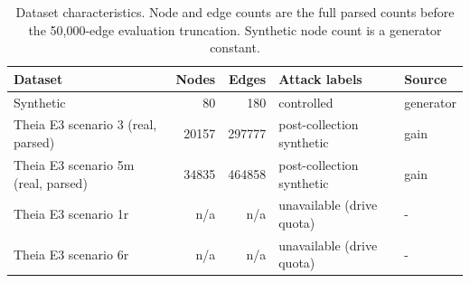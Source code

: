 \begin{table}[t]
\centering
\caption{Dataset characteristics. Node and edge counts are the full parsed counts before the 50{,}000-edge evaluation truncation. Synthetic node count is a generator constant.}
\label{tab:datasetsfull}
{\small
\begin{tabular}{p{3.4cm}rrp{3.0cm}p{1.4cm}}
\toprule
Dataset & Nodes & Edges & Attack labels & Source \\
\midrule
Synthetic & 80 & ~180 & controlled & generator \\
Theia E3 scenario 3 (real, parsed) & 20157 & 297777 & post-collection synthetic & gain \\
Theia E3 scenario 5m (real, parsed) & 34835 & 464858 & post-collection synthetic & gain \\
Theia E3 scenario 1r & n/a & n/a & unavailable (drive quota) & - \\
Theia E3 scenario 6r & n/a & n/a & unavailable (drive quota) & - \\
\bottomrule
\end{tabular}
}
\end{table}
